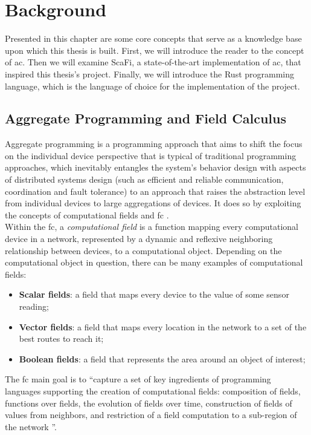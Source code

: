 
\chapter{Background}
\label{chap:background}
Presented in this chapter are some core concepts that serve as a knowledge base upon which this thesis is built.
First, we will introduce the reader to the concept of \ac{ac}. Then we will examine ScaFi, a state-of-the-art implementation of \ac{ac}, that inspired this thesis's project.
Finally, we will introduce the Rust programming language, which is the language of choice for the implementation of the project.

\section{Aggregate Programming and Field Calculus}
Aggregate programming \cite{Beal2016} is a programming approach that aims to shift the focus on the individual device perspective that is typical of traditional programming approaches, which
inevitably entangles the system's behavior design with aspects of distributed systems design (such as efficient and reliable communication, coordination and fault tolerance) to an approach that raises
the abstraction level from individual devices to large aggregations of devices. It does so by exploiting the concepts of computational fields and \ac{fc} \cite{10.1145/3285956, 10.1007/978-3-642-45364-9_11}.\\

Within the \ac{fc}, a \textit{computational field} is a function mapping every computational device in a network, represented by a dynamic and reflexive neighboring relationship between devices, to a computational object.
Depending on the computational object in question, there can be many examples of computational fields:
\begin{itemize}
    \item \textbf{Scalar fields}: a field that maps every device to the value of some sensor reading;
    \item \textbf{Vector fields}: a field that maps every location in the network to a set of the best routes to reach it;
    \item \textbf{Boolean fields}: a field that represents the area around an object of interest;
\end{itemize}

The \ac{fc} main goal is to ``capture a set of key ingredients of programming languages supporting the creation of computational fields: composition of fields, functions
over fields, the evolution of fields over time, construction of fields of values from neighbors, and restriction of a field computation to a sub-region of the network \cite{10.1007/978-3-642-45364-9_11}''.


